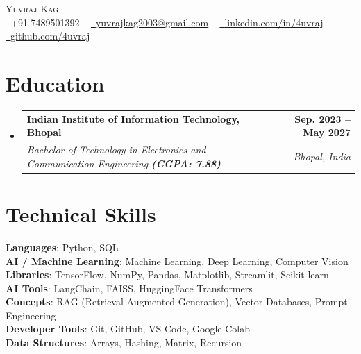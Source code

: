 \documentclass[letterpaper,11pt]{article}
\makeatletter
\newcommand{\resumeSubheading}[4]{
  \vspace{-2pt}\item
    \begin{tabular*}{1.0\textwidth}[t]{l@{\extracolsep{\fill}}r}
      \textbf{#1} & \textbf{\small #2} \\
      \textit{\small#3} & \textit{\small #4} \\
    \end{tabular*}\vspace{-7pt}
}
\newcommand{\resumeSubHeadingListStart}{\begin{itemize}[leftmargin=0.0in, label={}]}
\newcommand{\resumeSubHeadingListEnd}{\end{itemize}}
\makeatother
\begin{document}
\begin{center}
    {\Huge \scshape Yuvraj Kag} \\ \vspace{5pt}
    \small
    \raisebox{-0.1\height}\faPhone\ +91-7489501392 ~
    \href{mailto:yuvrajkag2003@gmail.com}{\raisebox{-0.2\height}\faEnvelope\ \underline{yuvrajkag2003@gmail.com}} ~
    \href{https://linkedin.com/in/4uvraj}{\raisebox{-0.2\height}\faLinkedin\ \underline{linkedin.com/in/4uvraj}} ~
    \href{https://github.com/4uvraj}{\raisebox{-0.2\height}\faGithub\ \underline{github.com/4uvraj}}
    \vspace{-8pt}
\end{center}

\section{Education}
  \resumeSubHeadingListStart
    \resumeSubheading
      {Indian Institute of Information Technology, Bhopal}{Sep. 2023 -- May 2027}
      {Bachelor of Technology in Electronics and Communication Engineering \textbf{(CGPA: 7.88)}}{Bhopal, India}
  \resumeSubHeadingListEnd

\section{Technical Skills}
 \begin{itemize}[leftmargin=0.15in, label={}]
    \small{\item{
     \textbf{Languages}{: Python, SQL} \\
     \textbf{AI / Machine Learning}{: Machine Learning, Deep Learning, Computer Vision} \\
     \textbf{Libraries}{: TensorFlow, NumPy, Pandas, Matplotlib, Streamlit, Scikit-learn} \\
     \textbf{AI Tools}{: LangChain, FAISS, HuggingFace Transformers} \\
     \textbf{Concepts}{: RAG (Retrieval-Augmented Generation), Vector Databases, Prompt Engineering} \\
     \textbf{Developer Tools}{: Git, GitHub, VS Code, Google Colab} \\
     \textbf{Data Structures}{: Arrays, Hashing, Matrix, Recursion}
    }}
 \end{itemize}
 \vspace{-16pt}

\end{document}
